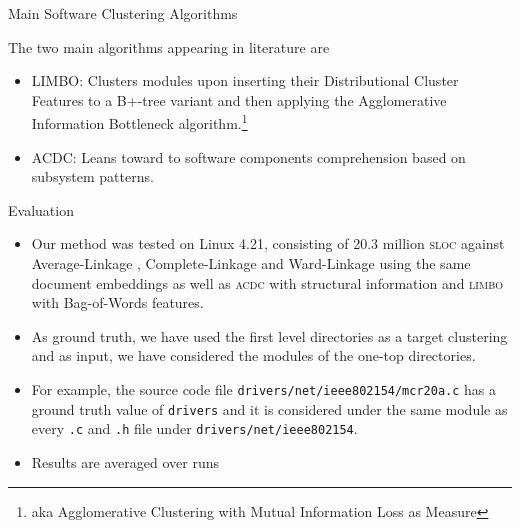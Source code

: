 \documentclass{beamer}
\begin{document}
\begin{frame}{Main Software Clustering Algorithms}

The two main algorithms appearing in literature \cite{maqbool_overview, large_study} are 

\begin{itemize}
	\item LIMBO: Clusters modules upon inserting their Distributional Cluster
Features to a B+-tree variant and then applying the Agglomerative
Information Bottleneck algorithm.\footnote{aka Agglomerative Clustering with Mutual Information Loss as Measure} 
	\item ACDC: Leans toward to software components comprehension
based on subsystem patterns.
    
\end{itemize}


    
\end{frame}


\begin{frame}{Evaluation}
    
    \begin{itemize}
         \item Our method was tested on Linux 4.21, consisting of 20.3 million \textsc{sloc} against Average-Linkage \cite{average}, Complete-Linkage \cite{complete} and Ward-Linkage \cite{ward} using the same document embeddings as well as \textsc{acdc} with structural information \cite{acdc} and \textsc{limbo} \cite{limbo} with Bag-of-Words features. 
         \item As ground truth, we have used the first level directories as a target clustering and as input, we have considered the modules of the one-top directories. 
         \item For example, the source code file \texttt{drivers/net/ieee802154\-/mcr20a.c} has a ground truth value of \texttt{drivers} and it is considered under the same module as every \texttt{.c} and \texttt{.h} file under \texttt{drivers/net/ieee802154}.
         \item Results are averaged over runs
         
    \end{itemize}
    
\end{frame}
\end{document}
